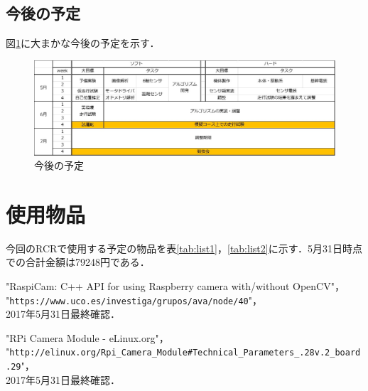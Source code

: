 \documentclass[10pt,a4j]{jarticle}
\begin{document}
\newpage



\subsection{今後の予定}
図\ref{fig:schedule}に大まかな今後の予定を示す．
\begin{figure}[bH]
\begin{center}
  \includegraphics[width=1.0\hsize]{./picture/schedule.eps}
 \caption{今後の予定}
 \label{fig:schedule}
\end{center}
\end{figure}



\section{使用物品}
今回のRCRで使用する予定の物品を表\ref{tab:list1}，\ref{tab:list2}に示す．5月31日時点での合計金額は79248円である．




\begin{thebibliography}{9}
    "RaspiCam: C++ API for using Raspberry camera with/without OpenCV"，\\
    "\texttt{https://www.uco.es/investiga/grupos/ava/node/40}"，\\
    2017年5月31日最終確認．

    "RPi Camera Module - eLinux.org"，\\
    "\texttt{http://elinux.org/Rpi\_Camera\_Module\#Technical\_Parameters\_.28v.2\_board.29}"，\\
    2017年5月31日最終確認．
\end{thebibliography}


\newpage
\setcounter{page}{1}
\pagestyle{fancy}
\renewcommand{\headrulewidth}{0.0pt}
\lhead{}
\cfoot{}

\end{document}
